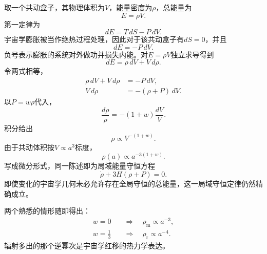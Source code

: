 取一个共动盒子，其物理体积为\(V\)，能量密度为\(\rho\)，总能量为
\begin{equation}
E=\rho V.
\end{equation}
第一定律为
\begin{equation}
dE=T\,dS-P\,dV.
\end{equation}
宇宙学膨胀被当作绝热过程处理，因此对于该共动盒子有\(dS=0\)，并且
\begin{equation}
dE=-P\,dV.
\label{eq:c04-adiabatic-first-law}
\end{equation}
负号表示膨胀的系统对外做功并损失内能。对\(E=\rho V\)独立求导得到
\begin{equation}
dE=\rho\,dV+V\,d\rho.
\end{equation}
令两式相等，
\begin{align}
\rho\,dV+V\,d\rho&=-P\,dV,\\
V\,d\rho&=-(\rho+P)\,dV.
\label{eq:c04-volume-continuity}
\end{align}
以\(P=w\rho\)代入，
\begin{equation}
\frac{d\rho}{\rho}=-(1+w)\frac{dV}{V}.
\end{equation}
积分给出
\begin{equation}
\rho\propto V^{-(1+w)}.
\end{equation}
由于共动体积按\(V\propto a^3\)标度，
\begin{equation}
\boxed{\rho(a)\propto a^{-3(1+w)}}.
\label{eq:c04-density-scaling}
\end{equation}
写成微分形式，同一陈述即为局域能量守恒方程
\begin{equation}
\dot\rho+3H(\rho+P)=0.
\label{eq:c04-continuity}
\end{equation}
即使变化的宇宙学几何未必允许存在全局守恒的总能量，这一局域守恒定律仍然精确成立。

两个熟悉的情形随即得出：
\begin{align}
w=0
&\quad\Longrightarrow\quad
\rho_{\mathrm m}\propto a^{-3},\\
w=\frac13
&\quad\Longrightarrow\quad
\rho_{\mathrm r}\propto a^{-4}.
\end{align}
辐射多出的那个逆幂次是宇宙学红移的热力学表达。

\begin{classroomqa}
\end{classroomqa}


